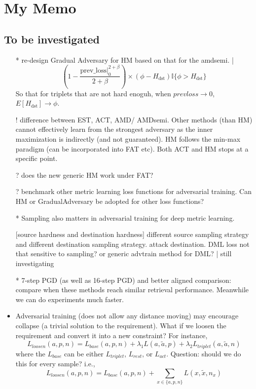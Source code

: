 \newpage
\appendix

\section{My Memo}

\subsection{To be investigated}

\begin{itemize}

	\item [*] re-design Gradual Adversary for HM based on that for the amdsemi. |
		\[
			(1-\frac{\text{prev\_loss}|_0^{2+\beta}}{2+\beta}) \times
			(\phi - H_\text{dst})\mathbb{I}\{\phi > H_\text{dst}\}
		\]
		So that for triplets that are not hard enoguh, when
		$prevloss \rightarrow 0$, $E[H_\text{dst}]\rightarrow \phi$.
	
	\item [!] difference between EST, ACT, AMD/ AMDsemi.
		Other methods (than HM) cannot effectively learn from the strongest
		adversary as the inner maximization is indirectly (and not guaranteed).
		HM follows the min-max paradigm (can be incorporated into FAT etc).
		Both ACT and HM stops at a specific point.
	
	\item [?] does the new generic HM work under FAT?

	\item [?] benchmark other metric learning loss functions for adversarial
		training. Can HM or GradualAdversary be adopted for other loss functions?

	\item [*] Sampling also matters in adversarial training for deep metric learning.

		[source hardness and destination hardness] different source sampling
		strategy and different destination sampling strategy. attack
		destination. DML loss not that sensitive to sampling? or generic
		advtrain method for DML? | still investigating

	\item [*] 7-step PGD (as well as 16-step PGD) and better aligned comparison:
		compare when these methods reach similar retrieval performance.
		Meanwhile we can do experiments much faster.

	\item Adversarial training (does not allow any distance moving) may
		encourage collapse (a trivial solution to the requirement). What if we
		loosen the requirement and convert it into a new constraint? For
		instance, \[
			L_{loosen}(a,p,n)=L_{base}(a,p,n)+\lambda_{1}L(a,\tilde{a},p)+\lambda_{2}L_{triplet}(a,\tilde{a},n)
		\] where the $L_{base}$ can be either $L_{triplet}$, $L_{rest}$, or
		$L_{act}$. Question: should we do this for every sample? i.e., \[
			L_{loosen}(a,p,n)=L_{base}(a,p,n)+\sum_{x\in\{a,p,n\}}L(x,\tilde{x},n_{x})
		\]


\end{itemize}
